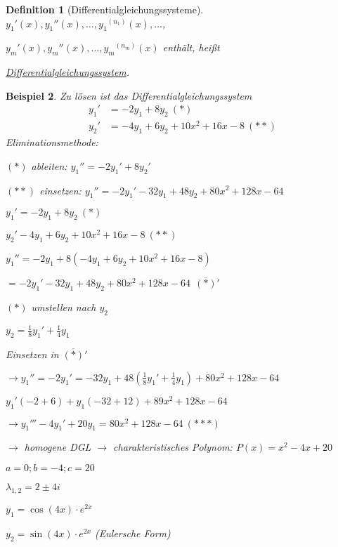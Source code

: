 \documentclass[fontset=ubuntu,11pt,a4paper,fleqn,headsepline]{scrreprt}
\newtheorem{defi}{Definition}[section]
\newtheorem{beispiel}[defi]{Beispiel}
\begin{document}
\begin{multicols}{2}
\begin{defi}[Differential\-gleichungs\-systeme]
            \({y_1}'(x),{y_1}''(x),\dots,{y_1}^{(n_1)}(x),\dots\),
            
            \({y_m}'(x),{y_m}''(x),\dots,{y_m}^{(n_m)}(x)\) enthält, heißt
            
            \underline{Differentialgleichungssystem}.
         \end{defi}
    
         \begin{beispiel}
            Zu lösen ist das Differentialgleichungssystem
            \begin{align*}
                {y_1}' &= -2y_1+8y_2\ (*) \\
                {y_2}' &= -4y_1+6y_2+10x^2+16x-8\ (**)
            \end{align*}
            Eliminationsmethode:
    
            \((*)\) ableiten: \({y_1}'' = -2{y_1}'+8{y_2}'\)
    
            \((**)\) einsetzen: \({y_1}'' = -2{y_1}'-32y_1+48y_2+80x^2+128x-64\)
    
            \(y_1'=-2y_1+8y_2\ (*)\)
    
            \(y_2'-4y_1+6y_2+10x^2+16x-8\ (**)\)
    
            \( y_1''=-2y_1+8(-4y_1+6y_2+10x^2+16x-8) \)
    
            \( =-2y_1'-32y_1+48y_2+80x^2+128x-64\ \ \overline{(*)}' \)
    
            \((*)\) umstellen nach \(y_2\)
    
            \(y_2=\frac{1}{8}y_1'+\frac{1}{4}y_1\)
    
            Einsetzen in \( \overline{(*)}' \)
    
            \( \rightarrow y_1''=-2y_1'=-32y_1+48(\frac{1}{8}y_1'+\frac{1}{4}y_1) + 80x^2+128x-64 \)
    
            \(y_1'(-2+6)+y_1(-32+12)+89x^2+128x-64 \)
    
            \(\rightarrow y_1'''-4y_1'+20y_1=80x^2+128x-64\ (***) \)
    
            \(\to\) homogene DGL \(\to\) charakteristisches Polynom: \(P(x)=x^2-4x+20\)
    
            \(a=0; b=-4;c=20\)
    
            \(\lambda_{1,2}=2\pm4i\)
    
            \(y_1=\cos(4x)\cdot e^{2x}\)
    
            \(y_2=\sin(4x)\cdot e^{2x}\) (Eulersche Form)
    

\end{beispiel}
\end{multicols}
\end{document}
